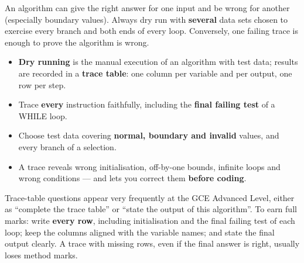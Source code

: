 \documentclass[11pt]{article}
\begin{document}
\begin{attention}
An algorithm can give the right answer for one input and be wrong for another (especially boundary values). Always dry run with \textbf{several} data sets chosen to exercise every branch and both ends of every loop. Conversely, one failing trace is enough to prove the algorithm is wrong.
\end{attention}

\begin{aretenir}
\begin{itemize}
\item \textbf{Dry running} is the manual execution of an algorithm with test data; results are recorded in a \textbf{trace table}: one column per variable and per output, one row per step.
\item Trace \textbf{every} instruction faithfully, including the \textbf{final failing test} of a WHILE loop.
\item Choose test data covering \textbf{normal, boundary and invalid} values, and every branch of a selection.
\item A trace reveals wrong initialisation, off-by-one bounds, infinite loops and wrong conditions --- and lets you correct them \textbf{before coding}.
\end{itemize}
\end{aretenir}

\begin{savaistu}
Trace-table questions appear very frequently at the GCE Advanced Level, either as ``complete the trace table'' or ``state the output of this algorithm''. To earn full marks: write \textbf{every row}, including initialisation and the final failing test of each loop; keep the columns aligned with the variable names; and state the final output clearly. A trace with missing rows, even if the final answer is right, usually loses method marks.
\end{savaistu}
\end{document}
